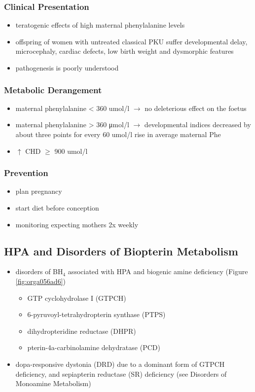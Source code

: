 \documentclass{scrartcl}
\begin{document}
\subsubsection{Clinical Presentation}
\label{sec:org6e548d3}
\begin{itemize}
\item teratogenic effects of high maternal phenylalanine levels
\item offspring of women with untreated classical PKU suffer developmental
delay, microcephaly, cardiac defects, low birth weight and
dysmorphic features
\item pathogenesis is poorly understood
\end{itemize}
\subsubsection{Metabolic Derangement}
\label{sec:orgbba92e9}
\begin{itemize}
\item maternal phenylalanine \textless{} 360 umol/l \(\to\) no deleterious effect on the foetus
\item maternal phenylalanine \textgreater{} 360 μmol/l \(\to\) developmental indices
decreased by about three points for every 60 umol/l rise in average
maternal Phe
\item \(\uparrow\) CHD \(\ge\) 900 umol/l
\end{itemize}
\subsubsection{Prevention}
\label{sec:orga727da7}
\begin{itemize}
\item plan pregnancy
\item start diet before conception
\item monitoring expecting mothers 2x weekly
\end{itemize}

\subsection{HPA and Disorders of Biopterin Metabolism}
\label{sec:orgbf01fe3}
\begin{itemize}
\item disorders of BH\(_{\text{4}}\) associated with HPA and biogenic amine deficiency (Figure \ref{fig:orga056ad6})
\begin{itemize}
\item GTP cyclohydrolase I (GTPCH)
\item 6-pyruvoyl-tetrahydropterin synthase (PTPS)
\item dihydropteridine reductase (DHPR)
\item pterin-4a-carbinolamine dehydratase (PCD)
\end{itemize}
\item dopa-responsive dystonia (DRD) due to a dominant form of GTPCH
deficiency, and sepiapterin reductase (SR) deficiency (see Disorders of Monoamine Metabolism)
\end{itemize}
\end{document}
